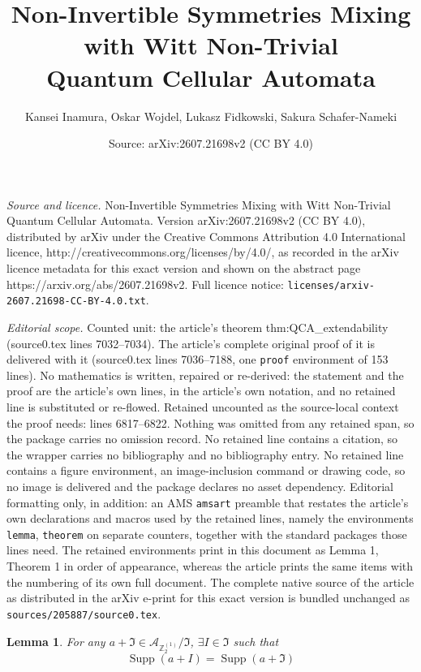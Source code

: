 \documentclass[10pt,a4paper]{amsart}
\title{Non-Invertible Symmetries Mixing with Witt Non-Trivial \\ Quantum Cellular Automata}
\author{Kansei Inamura, Oskar Wojdel, Lukasz Fidkowski, Sakura Schafer-Nameki}
\date{Source: arXiv:2607.21698v2 (CC BY 4.0)}
\newtheorem{lemma}{Lemma}
\newcommand{\Z}{{\mathbb Z}}
\newcommand{\be}{\begin{equation}}
\newcommand{\ee}{\end{equation}}
\newcommand{\mc}[1]{\mathcal{#1}}
\begin{document}
\maketitle

\noindent\emph{Source and licence.} Non-Invertible Symmetries Mixing with Witt Non-Trivial \\ Quantum Cellular Automata. Version arXiv:2607.21698v2 (CC BY 4.0), distributed by arXiv under the Creative Commons Attribution 4.0 International licence, http://creativecommons.org/licenses/by/4.0/, as recorded in the arXiv licence metadata for this exact version and shown on the abstract page https://arxiv.org/abs/2607.21698v2. Full licence notice: \texttt{licenses/arxiv-2607.21698-CC-BY-4.0.txt}.\par\smallskip

\noindent\textit{Editorial scope.} Counted unit: the article's theorem thm:QCA\_extendability (source0.tex lines 7032--7034). The article's complete original proof of it is delivered with it (source0.tex lines 7036--7188, one \texttt{proof} environment of 153 lines). No mathematics is written, repaired or re-derived: the statement and the proof are the article's own lines, in the article's own notation, and no retained line is substituted or re-flowed.  Retained uncounted as the source-local context the proof needs: lines 6817--6822.  Nothing was omitted from any retained span, so the package carries no omission record.  No retained line contains a citation, so the wrapper carries no bibliography and no bibliography entry.  No retained line contains a figure environment, an image-inclusion command or drawing code, so no image is delivered and the package declares no asset dependency.  Editorial formatting only, in addition: an AMS \texttt{amsart} preamble that restates the article's own declarations and macros used by the retained lines, namely the environments \texttt{lemma}, \texttt{theorem} on separate counters, together with the standard packages those lines need.  The retained environments print in this document as Lemma 1, Theorem 1 in order of appearance, whereas the article prints the same items with the numbering of its own full document.  The complete native source of the article as distributed in the arXiv e-print for this exact version is bundled unchanged as \texttt{sources/205887/source0.tex}.
\begin{lemma}\label{lemma:exact_support}
 For any $a + \mathfrak{I} \in \mc{A}_{\Z_2^{(1)}} / \mathfrak{I}$, $\exists I \in \mathfrak{I}$ such that
 \be
 \operatorname{Supp}(a + I) = \operatorname{Supp}(a + \mathfrak{I})
 \ee
\end{lemma}
\end{document}
